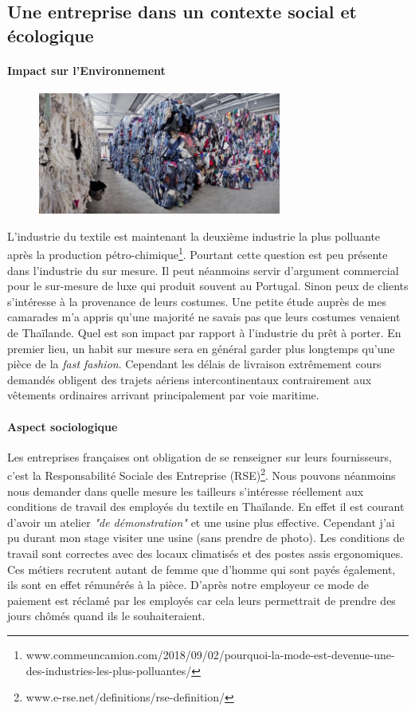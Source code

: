 \subsection[Contexte social et écologique]{Une entreprise dans un contexte social et \\écologique}
\paragraph{Impact sur l'Environnement}
\begin{figure}
\includegraphics[width=8cm]{image/recyclage.jpg}
\end{figure}
L'industrie du textile est maintenant la deuxième industrie la plus polluante après la production pétro-chimique\footnote{www.commeuncamion.com/2018/09/02/pourquoi-la-mode-est-devenue-une-des-industries-les-plus-polluantes/}. Pourtant cette question est peu présente dans l'industrie du sur mesure. Il peut néanmoins servir d'argument commercial pour le sur-mesure de luxe qui produit souvent au Portugal. Sinon peux de clients s'intéresse à la provenance de leurs costumes. Une petite étude auprès de mes camarades m’a appris qu'une majorité ne savais pas que leurs costumes venaient de Thaïlande. Quel est son impact par rapport à l'industrie du prêt à porter. En premier lieu, un habit sur mesure sera en général garder plus longtemps qu'une pièce de la \textit{fast fashion}. Cependant les délais de livraison extrêmement cours demandés obligent des trajets aériens intercontinentaux contrairement aux vêtements ordinaires arrivant principalement par voie maritime.
\paragraph{Aspect sociologique}
Les entreprises françaises ont obligation de se renseigner sur leurs fournisseurs, c'est la Responsabilité Sociale des Entreprise (RSE)\footnote{www.e-rse.net/definitions/rse-definition/}. Nous pouvons néanmoins nous demander dans quelle mesure les tailleurs s'intéresse réellement aux conditions de travail des employés du textile en Thaïlande. En effet il est courant d'avoir un atelier \textit{"de démonstration"} et une usine plus effective. Cependant j'ai pu durant mon stage visiter une usine (sans prendre de photo). Les conditions de travail sont correctes avec des locaux climatisés et des postes assis ergonomiques. Ces métiers recrutent autant de femme que d'homme qui sont payés également, ils sont en effet rémunérés à la pièce. D'après notre employeur ce mode de paiement est réclamé par les employés car cela leurs permettrait de prendre des jours chômés quand ils le souhaiteraient.
